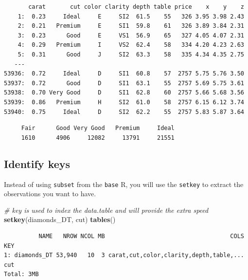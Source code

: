 \documentclass[
]{book}
\newenvironment{Shaded}{\begin{snugshade}}{\end{snugshade}}
\newcommand{\CommentTok}[1]{\textcolor[rgb]{0.56,0.35,0.01}{\textit{#1}}}
\newcommand{\KeywordTok}[1]{\textcolor[rgb]{0.13,0.29,0.53}{\textbf{#1}}}
\newcommand{\NormalTok}[1]{#1}
\newcommand{\OperatorTok}[1]{\textcolor[rgb]{0.81,0.36,0.00}{\textbf{#1}}}
\begin{document}
\begin{verbatim}
       carat       cut color clarity depth table price    x    y    z
    1:  0.23     Ideal     E     SI2  61.5    55   326 3.95 3.98 2.43
    2:  0.21   Premium     E     SI1  59.8    61   326 3.89 3.84 2.31
    3:  0.23      Good     E     VS1  56.9    65   327 4.05 4.07 2.31
    4:  0.29   Premium     I     VS2  62.4    58   334 4.20 4.23 2.63
    5:  0.31      Good     J     SI2  63.3    58   335 4.34 4.35 2.75
   ---                                                               
53936:  0.72     Ideal     D     SI1  60.8    57  2757 5.75 5.76 3.50
53937:  0.72      Good     D     SI1  63.1    55  2757 5.69 5.75 3.61
53938:  0.70 Very Good     D     SI1  62.8    60  2757 5.66 5.68 3.56
53939:  0.86   Premium     H     SI2  61.0    58  2757 6.15 6.12 3.74
53940:  0.75     Ideal     D     SI2  62.2    55  2757 5.83 5.87 3.64
\end{verbatim}

\begin{Shaded}
\end{Shaded}

\begin{verbatim}
     Fair      Good Very Good   Premium     Ideal 
     1610      4906     12082     13791     21551 
\end{verbatim}

\hypertarget{identify-keys}{%
\subsection{Identify keys}\label{identify-keys}}

Instead of using \texttt{subset} from the \texttt{base} R, you will use the \texttt{setkey} to extract the observations you want to have.

\begin{Shaded}
\begin{Highlighting}[]
\CommentTok{# key is used to index the data.table and will provide the extra speed}
\KeywordTok{setkey}\NormalTok{(diamonds_DT, cut)}
\KeywordTok{tables}\NormalTok{()}
\end{Highlighting}
\end{Shaded}

\begin{verbatim}
          NAME   NROW NCOL MB                                    COLS KEY
1: diamonds_DT 53,940   10  3 carat,cut,color,clarity,depth,table,... cut
Total: 3MB
\end{verbatim}
\end{document}
